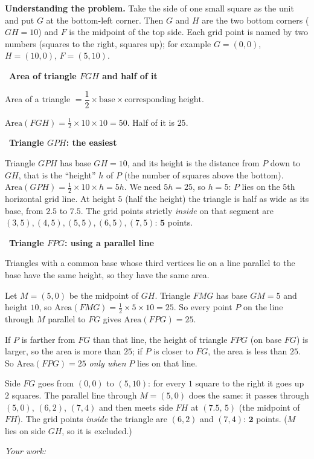 \documentclass[11pt]{article}
\newif\ifsol \solfalse
\newcommand{\probsol}[1]{%
  \begin{lrbox}{\solmeasure}\begin{minipage}{\dimexpr\linewidth-24pt\relax}#1\end{minipage}\end{lrbox}%
  \ifsol
    \begin{solbox}#1\end{solbox}%
  \else
    \setlength{\solht}{\dimexpr\ht\solmeasure+\dp\solmeasure+0.85cm\relax}%
    \ifdim\solht<1.35cm\setlength{\solht}{1.35cm}\fi
    \ifdim\solht>\StudentMaxWork\setlength{\solht}{\StudentMaxWork}\fi
    \begin{tcolorbox}[colback=white,colframe=Line,boxrule=0.8pt,arc=5pt,
      left=8pt,right=8pt,top=4pt,bottom=4pt,height=\solht]{\footnotesize\color{Slate}\itshape\WorkWord}\end{tcolorbox}%
  \fi}
\newlength{\StudentMaxWork}\setlength{\StudentMaxWork}{7.5cm}
\newcommand{\step}[2]{\par\smallskip\noindent{\bfseries\color{tmBlue!85!black}\StepWord~#1.}\ {\bfseries #2}\par\nopagebreak}
\def\WorkWord{Your work:}
\def\StepWord{Step}
\begin{document}
\probsol{
\textbf{Understanding the problem.} Take the side of one small square as the unit and put $G$ at the bottom-left corner. Then $G$ and $H$
are the two bottom corners ($GH=10$) and $F$ is the midpoint of the top side. Each grid point is named by two numbers (squares to the
right, squares up); for example $G=(0,0)$, $H=(10,0)$, $F=(5,10)$.

\step{1}{Area of triangle $FGH$ and half of it}
\begin{recallbox}Area of a triangle $=\dfrac12\times\text{base}\times\text{corresponding height}$.\end{recallbox}
$\text{Area}(FGH)=\frac12\times10\times10=50$. Half of it is $25$.

\step{2}{Triangle $GPH$: the easiest}
Triangle $GPH$ has base $GH=10$, and its height is the distance from $P$ down to $GH$, that is the ``height'' $h$ of $P$ (the number of
squares above the bottom). $\text{Area}(GPH)=\frac12\times10\times h=5h$. We need $5h=25$, so $h=5$: $P$ lies on the $5$th horizontal grid
line. At height $5$ (half the height) the triangle is half as wide as its base, from $2.5$ to $7.5$. The grid points strictly \emph{inside}
on that segment are $(3,5),(4,5),(5,5),(6,5),(7,5)$: $\mathbf{5}$ points.

\step{3}{Triangle $FPG$: using a parallel line}
\begin{recallbox}Triangles with a common base whose third vertices lie on a line parallel to the base have the same height, so they have the
same area.\end{recallbox}
Let $M=(5,0)$ be the midpoint of $GH$. Triangle $FMG$ has base $GM=5$ and height $10$, so $\text{Area}(FMG)=\frac12\times5\times10=25$.
So every point $P$ on the line through $M$ parallel to $FG$ gives $\text{Area}(FPG)=25$.
\begin{proofbox}If $P$ is farther from $FG$ than that line, the height of triangle $FPG$ (on base $FG$) is larger, so the area is more than
$25$; if $P$ is closer to $FG$, the area is less than $25$. So $\text{Area}(FPG)=25$ \emph{only when} $P$ lies on that line.\end{proofbox}
Side $FG$ goes from $(0,0)$ to $(5,10)$: for every $1$ square to the right it goes up $2$ squares. The parallel line through $M=(5,0)$ does the
same: it passes through $(5,0)$, $(6,2)$, $(7,4)$ and then meets side $FH$ at $(7.5,\,5)$ (the midpoint of $FH$). The grid points
\emph{inside} the triangle are $(6,2)$ and $(7,4)$: $\mathbf{2}$ points. ($M$ lies on side $GH$, so it is excluded.)

}
\end{document}
